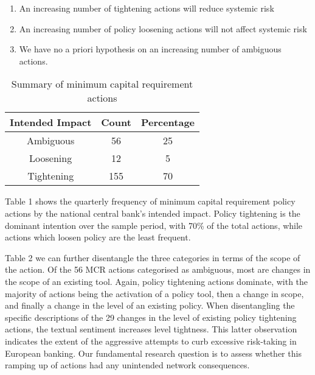 \documentclass[
  10pt,
]{article}
\providecommand{\tightlist}{%
  \setlength{\itemsep}{0pt}\setlength{\parskip}{0pt}}
\begin{document}
\begin{enumerate}
\def\labelenumi{\arabic{enumi}.}
\tightlist
\item
  An increasing number of tightening actions will reduce systemic risk
\item
  An increasing number of policy loosening actions will not affect
  systemic risk
\item
  We have no a priori hypothesis on an increasing number of ambiguous
  actions.
\end{enumerate}

\begin{table}[H]

\caption{\label{tab:mcr}Summary of minimum capital requirement actions}
\centering
\begin{tabular}[t]{ccc}
\toprule
Intended Impact & Count & Percentage\\
\midrule
Ambiguous & 56 & 25\\
Loosening & 12 & 5\\
Tightening & 155 & 70\\
\bottomrule
\end{tabular}
\end{table}

Table 1 shows the quarterly frequency of minimum capital requirement
policy actions by the national central bank's intended impact. Policy
tightening is the dominant intention over the sample period, with 70\%
of the total actions, while actions which loosen policy are the least
frequent.

\begin{table}[H]

\caption{\label{tab:action types}Type of action of policy tool}
\centering
{}
\end{table}

Table 2 we can further disentangle the three categories in terms of the
scope of the action. Of the 56 MCR actions categorised as ambiguous,
most are changes in the scope of an existing tool. Again, policy
tightening actions dominate, with the majority of actions being the
activation of a policy tool, then a change in scope, and finally a
change in the level of an existing policy. When disentangling the
specific descriptions of the 29 changes in the level of existing policy
tightening actions, the textual sentiment increases level tightness.
This latter observation indicates the extent of the aggressive attempts
to curb excessive risk-taking in European banking. Our fundamental
research question is to assess whether this ramping up of actions had
any unintended network consequences.
\end{document}
